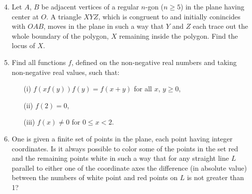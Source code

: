\documentclass[12pt]{article}
\begin{document}
\begin{enumerate}
\setcounter{enumi}{3}
\item
Let $A$, $B$ be adjacent vertices of a regular $n$-gon ($n \geq 5$) in the
plane having center at $O$.  A triangle $XYZ$, which is congruent to and
initially conincides with $OAB$, moves in the plane in such a way that $Y$ and
$Z$ each trace out the whole boundary of the polygon, $X$ remaining inside the
polygon.  Find the locus of $X$.

\item
Find all functions $f$, defined on the non-negative real numbers and taking
non-negative real values, such that:
  \begin{enumerate}
  \item[(i)] $f(xf(y)) f(y) = f(x + y)$ for all $x$, $y \geq 0$,
  \item[(ii)] $f(2) = 0$,
  \item[(iii)] $f(x) \neq 0$ for $0 \leq x < 2$.
  \end{enumerate}

\item
One is given a finite set of points in the plane, each point having integer
coordinates.  Is it always possible to color some of the points in the set red
and the remaining points white in such a way that for any straight line $L$
parallel to either one of the coordinate axes the difference (in absolute
value) between the numbers of white point and red points on $L$ is not greater
than 1?
\end{enumerate}
\end{document}
